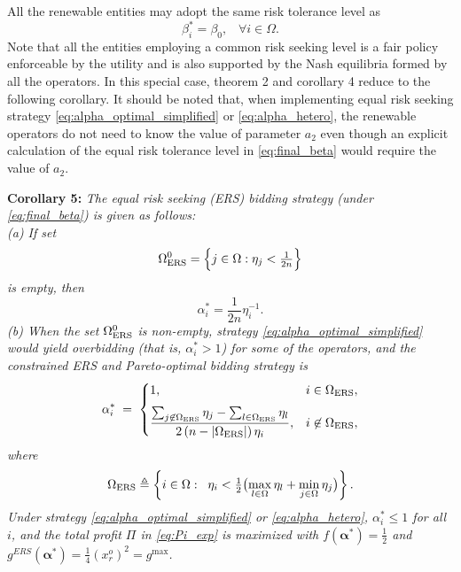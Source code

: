 \documentclass[conference]{IEEEtran}
\begin{document}
All the renewable entities may adopt the same risk tolerance level as
\begin{equation}
    \beta_i^*=\beta_0, \;\;\; \forall i\in\Omega. \label{eq:final_beta}
\end{equation}   
Note that all the entities employing a common risk seeking level is a fair policy enforceable by the utility and is also supported by the Nash equilibria formed by all the operators. In this special case, theorem 2 and corollary 4 reduce to the following corollary. 
It should be noted that, when implementing equal risk seeking strategy \eqref{eq:alpha_optimal_simplified} or \eqref{eq:alpha_hetero}, the renewable operators do not need to know the value of parameter $a_2$ even though an explicit calculation of the equal risk tolerance level in \eqref{eq:final_beta}  would require the value of $a_2$.


\noindent \textbf{Corollary 5:} {\it The equal risk seeking (ERS) bidding strategy (under \eqref{eq:final_beta}) is given as follows: \\
(a) If set
\begin{equation}
    \Omega_{\rm ERS}^0 = \Bigl\{j\in\Omega : \eta_j < \tfrac{1}{2n}\Bigr\}
    \label{eq:overbid_bound}
\end{equation}
is empty, then
\begin{equation}
    \alpha_i^* = \frac{1}{2n}\eta_i^{-1}. \label{eq:alpha_optimal_simplified}
\end{equation}
(b) When the set $\Omega_{\rm ERS}^0$ is non-empty, 
strategy \eqref{eq:alpha_optimal_simplified} would yield overbidding (that is, $\alpha_i^*>1$) for some of the operators, and the constrained ERS and Pareto-optimal bidding strategy is
\begin{equation}
    \alpha_i^* \;=\; \begin{cases}
        1, & i\in\Omega_{\rm ERS},\\[6pt]
        \displaystyle
        \frac{\sum_{j\not\in \Omega_{\rm ERS}}\eta_j-\sum_{l\in\Omega_{\rm ERS}}\eta_l}{2\,(n-|\Omega_{\rm ERS}|)\,\eta_i}, & i\not\in\Omega_{\rm ERS},
    \end{cases}
    \label{eq:alpha_hetero}
\end{equation}
where 
\begin{equation}
    \Omega_{\rm ERS}\triangleq\left\{i\in\Omega: \;\; \eta_i < \tfrac{1}{2}\bigl(\max_{l\in\Omega}\eta_l+\min_{j\in\Omega}\eta_j\bigr)\right\}.  
    \label{eq:partition_Omega}
\end{equation}
Under strategy \eqref{eq:alpha_optimal_simplified} or \eqref{eq:alpha_hetero}, 
$\alpha_i^*\leq 1$ for all $i$, and the total profit $\Pi$ in \eqref{eq:Pi_exp} is maximized with $f(\boldsymbol{\alpha}^*)=\tfrac12$ and $g^{ERS}(\boldsymbol{\alpha}^*)=\tfrac{1}{4}(x_r^o)^2 =g^{\max}$.}
\end{document}
